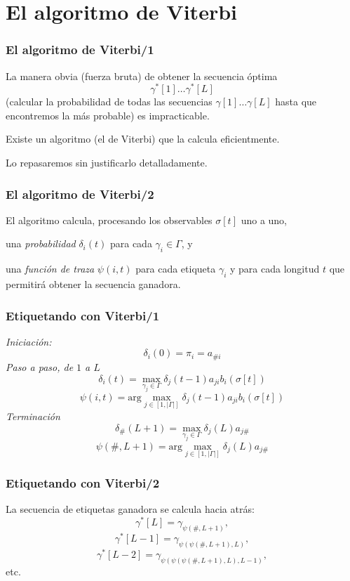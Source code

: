 \documentclass{beamer}
\begin{document}
\section{El algoritmo de Viterbi}
\begin{frame}
\frametitle{ El algoritmo de Viterbi/1}

{
{
La manera obvia (fuerza bruta) de obtener la secuencia óptima 
  \[\gamma^*[1]\ldots\gamma^*[L]\] (calcular la probabilidad de  todas
  las secuencias \(\gamma[1]\ldots\gamma[L]\) hasta que encontremos la más probable) es impracticable.}

{Existe un algoritmo (el de Viterbi) que la calcula
  eficientmente.} 

{Lo repasaremos sin justificarlo detalladamente.}

}
\end{frame}
\begin{frame}
\frametitle{El algoritmo de Viterbi/2}

{
{El algoritmo calcula, procesando los observables \(\sigma[t]\)
  uno a uno,}
\begin{itemize}
{\item una \emph{probabilidad} \(\delta_i(t)\) para cada
  \(\gamma_i\in\Gamma\), y }
{\item una \emph{función de traza} \(\psi(i,t)\) para  cada
  etiqueta \(\gamma_i\) y para cada longitud \(t\) que
  permitirá obtener la secuencia ganadora.}
\end{itemize}
}
\end{frame}
\begin{frame}
\frametitle{ Etiquetando con Viterbi/1
}
{
{\emph{Iniciación:}
\[\delta_i(0)=\pi_i=a_{\#i}\]
}
{\emph{Paso a paso, de \(1\) a \(L\)}
\[\delta_i(t)= \max_{\gamma_j\in\Gamma} \delta_j(t-1) a_{ji} b_i(\sigma[t]) \]
\[\psi(i,t)= \mathrm{arg} \max_{j\in[1,|\Gamma|]} \delta_j(t-1) a_{ji} b_i(\sigma[t]) \]
}
{\emph{Terminación}
\[\delta_\#(L+1)= \max_{\gamma_j\in\Gamma} \delta_j(L) a_{j\#} \]
\[\psi(\#,L+1)= \mathrm{arg} \max_{j\in[1,|\Gamma|]} \delta_j(L) a_{j\#} \]
}

}
\end{frame}
\begin{frame}
\frametitle{ Etiquetando con Viterbi/2}

{
{La secuencia de etiquetas ganadora se calcula hacia atrás:
\[\gamma^*[L]=\gamma_{\psi(\#,L+1)},\]
\[\gamma^*[L-1]=\gamma_{\psi(\psi(\#,L+1),L)},\]
\[\gamma^*[L-2]=\gamma_{\psi(\psi(\psi(\#,L+1),L),L-1)},\]
etc.
}

}
\end{frame}
\end{document}

